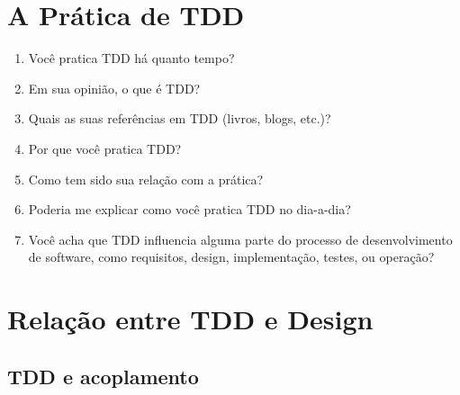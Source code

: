 \section{A Prática de TDD}
\label{entrevista:pratica}

\begin{enumerate}
	\item Você pratica TDD há quanto tempo?

	\item Em sua opinião, o que é TDD?
	
	\item Quais as suas referências em TDD (livros, blogs, etc.)?

	\item Por que você pratica TDD?

	\item Como tem sido sua relação com a prática?

	\item Poderia me explicar como você pratica TDD no dia-a-dia?

	\item Você acha que TDD influencia alguma parte do processo de desenvolvimento
	de software, como requisitos, design, implementação, testes, ou operação?
\end{enumerate}

\section{Relação entre TDD e Design}

\subsection{TDD e acoplamento}
\label{entrevista:acoplamento}


